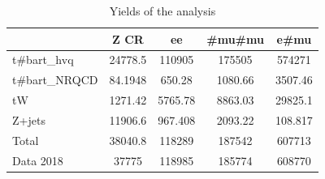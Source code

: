 \documentclass[10pt]{article}
\begin{document}
\begin{table}[htbp]
\begin{center}
\begin{tabular}{|l|S|S|S|S|}
\hline 
 & {Z CR} & {ee} & {#mu#mu} & {e#mu}\\
\hline 
  t#bar{t}_{hvq}   & 24778.5  & 110905  & 175505  & 574271  \\ 
  t#bar{t}_{NRQCD}   & 84.1948  & 650.28  & 1080.66  & 3507.46  \\ 
  tW   & 1271.42  & 5765.78  & 8863.03  & 29825.1  \\ 
  Z+jets   & 11906.6  & 967.408  & 2093.22  & 108.817  \\ 
\hline 
  Total  & 38040.8  & 118289  & 187542  & 607713  \\ 
\hline 
  Data 2018   & 37775 & 118985 & 185774 & 608770 \\ 
\hline 
\end{tabular} 
\caption{Yields of the analysis} 
\end{center} 
\end{table} 
\end{document}
